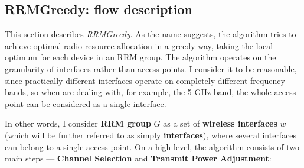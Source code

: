 \subsection{RRMGreedy: flow description}
This section describes \textit{RRMGreedy}.
As the name suggests, the algorithm tries to achieve optimal radio resource allocation in a greedy way, taking the local optimum for each device in an RRM group.
The algorithm operates on the granularity of interfaces rather than access points. I consider it to be reasonable, since practically different interfaces operate on completely different frequency bands, so when are dealing with, for example, the 5 GHz band, the whole access point can be considered as a single interface.

In other words, I consider \textbf{RRM group} $G$ as a set of \textbf{wireless interfaces} $w$ (which will be further referred to as simply \textbf{interfaces}), where several interfaces can belong to a single access point.
On a high level, the algorithm consists of two main steps --- \textbf{Channel Selection} and \textbf{Transmit Power Adjustment}:
\everymath{\displaystyle}
